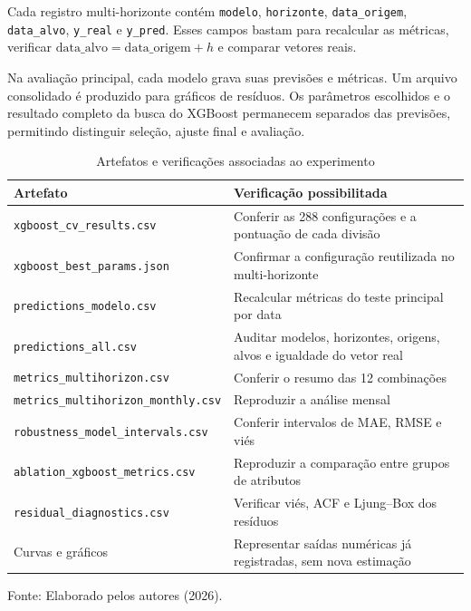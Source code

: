 Cada registro multi-horizonte contém \texttt{modelo}, \texttt{horizonte}, \texttt{data\_origem}, \texttt{data\_alvo}, \texttt{y\_real} e \texttt{y\_pred}. Esses campos bastam para recalcular as métricas, verificar $\text{data\_alvo}=\text{data\_origem}+h$ e comparar vetores reais.

Na avaliação principal, cada modelo grava suas previsões e métricas. Um arquivo consolidado é produzido para gráficos de resíduos. Os parâmetros escolhidos e o resultado completo da busca do XGBoost permanecem separados das previsões, permitindo distinguir seleção, ajuste final e avaliação.

\begin{table}[H]
\centering
\caption{Artefatos e verificações associadas ao experimento}
\label{tab:artefatos_experimento}
\small
\begin{tabularx}{\textwidth}{p{4.7cm} X}
\toprule
\textbf{Artefato} & \textbf{Verificação possibilitada} \\
\midrule
\texttt{xgboost\_cv\_results.csv} & Conferir as 288 configurações e a pontuação de cada divisão \\
\texttt{xgboost\_best\_}\allowbreak\texttt{params.json} & Confirmar a configuração reutilizada no multi-horizonte \\
\texttt{predictions\_}\allowbreak\texttt{modelo.csv} & Recalcular métricas do teste principal por data \\
\texttt{predictions\_}\allowbreak\texttt{all.csv} & Auditar modelos, horizontes, origens, alvos e igualdade do vetor real \\
\texttt{metrics\_multi}\allowbreak\texttt{horizon.csv} & Conferir o resumo das 12 combinações \\
\texttt{metrics\_multi}\allowbreak\texttt{horizon\_monthly.csv} & Reproduzir a análise mensal \\
\texttt{robustness\_}\allowbreak\texttt{model\_intervals.csv} & Conferir intervalos de MAE, RMSE e viés \\
\texttt{ablation\_xgboost\_}\allowbreak\texttt{metrics.csv} & Reproduzir a comparação entre grupos de atributos \\
\texttt{residual\_}\allowbreak\texttt{diagnostics.csv} & Verificar viés, ACF e Ljung--Box dos resíduos \\
Curvas e gráficos & Representar saídas numéricas já registradas, sem nova estimação \\
\bottomrule
\end{tabularx}
\small{Fonte: Elaborado pelos autores (2026).}
\end{table}

